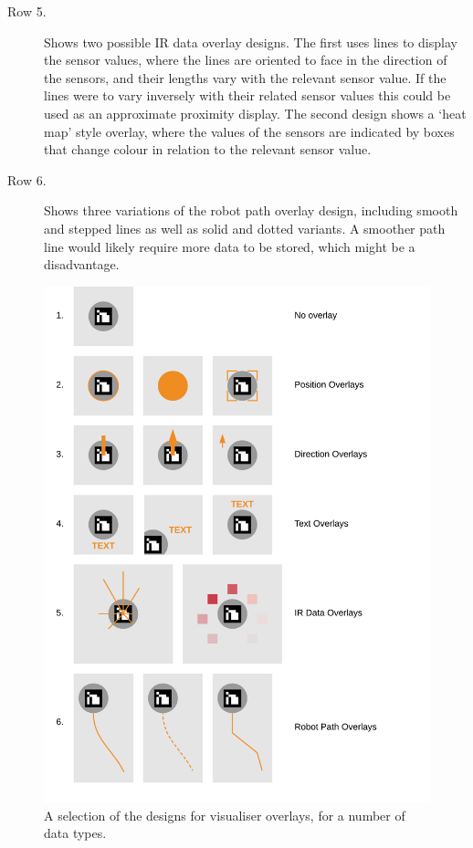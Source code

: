 \begin{description}
\item [Row 5.] Shows two possible IR data overlay designs. The first uses lines to display the sensor values, where the lines are oriented to face in the direction of the sensors, and their lengths vary with the relevant sensor value. If the lines were to vary inversely with their related sensor values this could be used as an approximate proximity display. The second design shows a `heat map' style overlay, where the values of the sensors are indicated by boxes that change colour in relation to the relevant sensor value. 

\item [Row 6.] Shows three variations of the robot path overlay design, including smooth and stepped lines as well as solid and dotted variants. A smoother path line would likely require more data to be stored, which might be a disadvantage.
\end{description}

\begin{figure}
	\centering
	\includegraphics[scale=1]{Figures/OverlayDesigns.png}
	\decoRule
	\caption[Visualiser Overlay Designs]{A selection of the designs for visualiser overlays, for a number of data types.}
	\label{fig:OverlayDesigns}
\end{figure}

